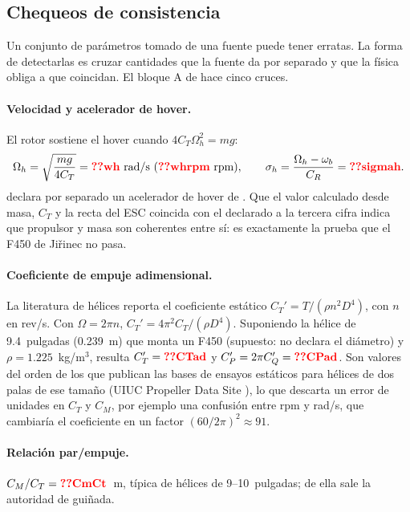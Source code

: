 \subsection{Chequeos de consistencia}

Un conjunto de parámetros tomado de una fuente puede tener erratas. La
forma de detectarlas es cruzar cantidades que la fuente da por separado y
que la física obliga a que coincidan. El bloque A de
 hace cinco cruces.

\paragraph{Velocidad y acelerador de hover.} El rotor sostiene el hover
cuando $4C_T\Omega_h^2=mg$:
\begin{equation}
\Omega_h=\sqrt{\frac{mg}{4C_T}}=\val{wh}~\text{rad/s}\ (\val{whrpm}~\text{rpm}),\qquad
\sigma_h=\frac{\Omega_h-\omega_b}{C_R}=\val{sigmah}.
\label{eq:hover}
\end{equation}
 declara por separado un acelerador de hover de
. Que el valor calculado desde masa, $C_T$ y la recta del ESC
coincida con el declarado a la tercera cifra indica que propulsor y masa son
coherentes entre sí: es exactamente la prueba que el F450 de Jiřinec no pasa.

\paragraph{Coeficiente de empuje adimensional.} La literatura de hélices
reporta el coeficiente estático $C_T'=T/(\rho n^2D^4)$, con $n$ en rev/s. Con
$\Omega=2\pi n$, $C_T'=4\pi^2C_T/(\rho D^4)$. Suponiendo la hélice de
9.4~pulgadas (0.239~m) que monta un F450 (supuesto:  no declara
el diámetro) y $\rho=1.225$~kg/m$^3$, resulta $C_T'=\val{CTad}$ y
$C_P'=2\pi C_Q'=\val{CPad}$. Son valores del orden de los que publican las
bases de ensayos estáticos para hélices de dos palas de ese tamaño (UIUC
Propeller Data Site \cite{uiuc}), lo que descarta un error de unidades en
$C_T$ y $C_M$, por ejemplo una confusión entre rpm y rad/s, que cambiaría el
coeficiente en un factor $(60/2\pi)^2\approx91$.

\paragraph{Relación par/empuje.} $C_M/C_T=\val{CmCt}$~m, típica de
hélices de 9--10~pulgadas; de ella sale la autoridad de guiñada.


